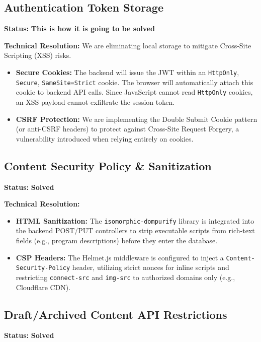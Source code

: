\documentclass[12pt, a4paper]{article}
\begin{document}
\subsection{Authentication Token Storage}
\textbf{Status:} \textcolor{planned}{\textbf{This is how it is going to be solved}}

\textbf{Technical Resolution:}
We are eliminating local storage to mitigate Cross-Site Scripting (XSS) risks.
\begin{itemize}
    \item \textbf{Secure Cookies:} The backend will issue the JWT within an \texttt{HttpOnly}, \texttt{Secure}, \texttt{SameSite=Strict} cookie. The browser will automatically attach this cookie to backend API calls. Since JavaScript cannot read \texttt{HttpOnly} cookies, an XSS payload cannot exfiltrate the session token.
    \item \textbf{CSRF Protection:} We are implementing the Double Submit Cookie pattern (or anti-CSRF headers) to protect against Cross-Site Request Forgery, a vulnerability introduced when relying entirely on cookies.
\end{itemize}

\subsection{Content Security Policy \& Sanitization}
\textbf{Status:} \textcolor{solved}{\textbf{Solved}}

\textbf{Technical Resolution:}
\begin{itemize}
    \item \textbf{HTML Sanitization:} The \texttt{isomorphic-dompurify} library is integrated into the backend POST/PUT controllers to strip executable scripts from rich-text fields (e.g., program descriptions) before they enter the database.
    \item \textbf{CSP Headers:} The Helmet.js middleware is configured to inject a \texttt{Content-Security-Policy} header, utilizing strict nonces for inline scripts and restricting \texttt{connect-src} and \texttt{img-src} to authorized domains only (e.g., Cloudflare CDN).
\end{itemize}

\subsection{Draft/Archived Content API Restrictions}
\textbf{Status:} \textcolor{solved}{\textbf{Solved}}
\end{document}
